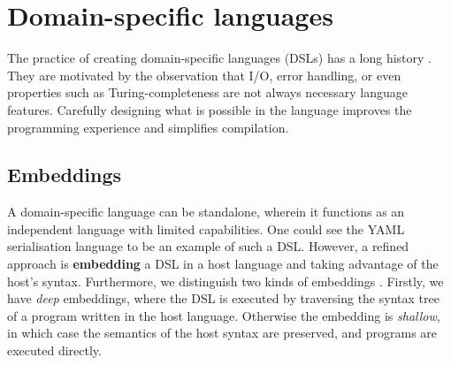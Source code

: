 




\section{Domain-specific languages}

The practice of creating domain-specific languages (DSLs) has a long history \cite{hudak1996building}. They are motivated by the observation that I/O, error handling, or even properties such as Turing-completeness are not always necessary language features. Carefully designing what is possible in the language improves the programming experience and simplifies compilation.

\subsection{Embeddings}

A domain-specific language can be standalone, wherein it functions as an independent language with limited capabilities. One could see the YAML serialisation language to be an example of such a DSL. However, a refined approach is \textbf{embedding} a DSL in a host language and taking advantage of the host's syntax. Furthermore, we distinguish two kinds of embeddings \cite{gibbons2014folding}. Firstly, we have \textit{deep} embeddings, where the DSL is executed by traversing the syntax tree of a program written in the host language. Otherwise the embedding is \textit{shallow}, in which case the semantics of the host syntax are preserved, and programs are executed directly.

